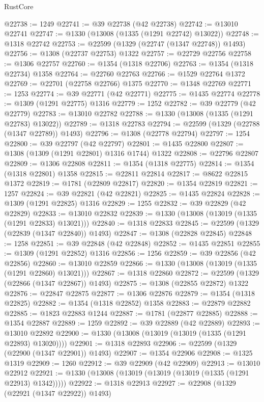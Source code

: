 \begin{lexlean}{RustCore}
\begin{coremodule}
@22738 := 1249
@22741 := @39 @22738 (@42 @22738)
@22742 := @13010 @22741
@22747 := @1330 (@13008 (@1335 (@1291 @22742) @13022))
@22748 := @1318 @22742
@22753 := @22599 (@1329 (@22747 (@1347 @22748)) @1493)
@22756 := @1308 (@22737 @22753) @1322
@22757 := @22729 @22756
@22758 := @1306 @22757
@22760 := @1354 (@1318 @22706)
@22763 := @1354 (@1318 @22734) @1358
@22764 := @22760 @22763
@22766 := @1529 @22764 @1372
@22769 := @22701 (@22758 @22766) @1375
@22770 := @1348 @22769
@22771 := 1253
@22774 := @39 @22771 (@42 @22771)
@22775 := @1435 @22774
@22778 := @1309 (@1291 @22775) @1316
@22779 := 1252
@22782 := @39 @22779 (@42 @22779)
@22783 := @13010 @22782
@22788 := @1330 (@13008 (@1335 (@1291 @22783) @13022))
@22789 := @1318 @22783
@22794 := @22599 (@1329 (@22788 (@1347 @22789)) @1493)
@22796 := @1308 (@22778 @22794)
@22797 := 1254
@22800 := @39 @22797 (@42 @22797)
@22801 := @1435 @22800
@22807 := @1308 (@1309 (@1291 @22801) @1316 @1744) @1322
@22808 := @22796 @22807
@22809 := @1306 @22808
@22811 := @1354 (@1318 @22775)
@22814 := @1354 (@1318 @22801) @1358
@22815 := @22811 @22814
@22817 := @8622 @22815 @1372
@22819 := @1781 (@22809 @22817)
@22820 := @1354 @22819
@22821 := 1257
@22824 := @39 @22821 (@42 @22821)
@22825 := @1435 @22824
@22828 := @1309 (@1291 @22825) @1316
@22829 := 1255
@22832 := @39 @22829 (@42 @22829)
@22833 := @13010 @22832
@22839 := @1330 (@13008 (@13019 (@1335 (@1291 @22833) @13021)))
@22840 := @1318 @22833
@22845 := @22599 (@1329 (@22839 (@1347 @22840)) @1493)
@22847 := @1308 (@22828 @22845)
@22848 := 1258
@22851 := @39 @22848 (@42 @22848)
@22852 := @1435 @22851
@22855 := @1309 (@1291 @22852) @1316
@22856 := 1256
@22859 := @39 @22856 (@42 @22856)
@22860 := @13010 @22859
@22866 := @1330 (@13008 (@13019 (@1335 (@1291 @22860) @13021)))
@22867 := @1318 @22860
@22872 := @22599 (@1329 (@22866 (@1347 @22867)) @1493)
@22875 := @1308 (@22855 @22872) @1322
@22876 := @22847 @22875
@22877 := @1306 @22876
@22879 := @1354 (@1318 @22825)
@22882 := @1354 (@1318 @22852) @1358
@22883 := @22879 @22882
@22885 := @1823 @22883 @1244
@22887 := @1781 (@22877 @22885)
@22888 := @1354 @22887
@22889 := 1259
@22892 := @39 @22889 (@42 @22889)
@22893 := @13010 @22892
@22900 := @1330 (@13008 (@13019 (@13019 (@1335 (@1291 @22893) @13020))))
@22901 := @1318 @22893
@22906 := @22599 (@1329 (@22900 (@1347 @22901)) @1493)
@22907 := @1354 @22906
@22908 := @1325 @1319
@22909 := 1260
@22912 := @39 @22909 (@42 @22909)
@22913 := @13010 @22912
@22921 := @1330 (@13008 (@13019 (@13019 (@13019 (@1335 (@1291 @22913) @1342)))))
@22922 := @1318 @22913
@22927 := @22908 (@1329 (@22921 (@1347 @22922)) @1493)

\end{coremodule}
\end{lexlean}

